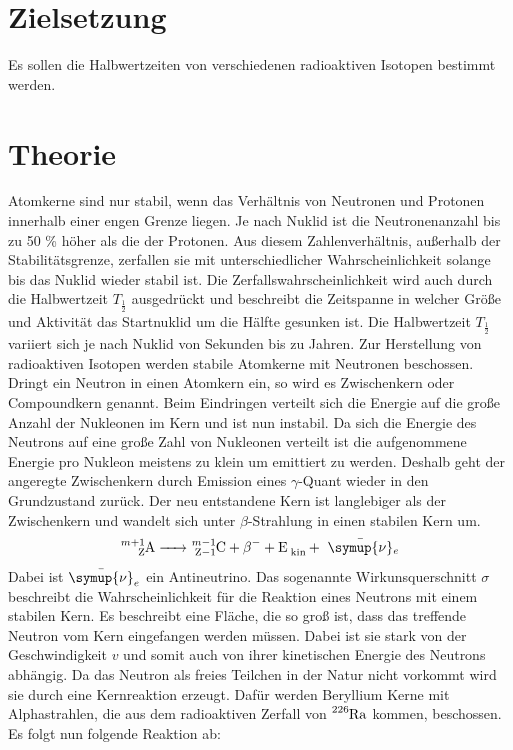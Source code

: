 \section{Zielsetzung}
Es sollen die Halbwertzeiten von verschiedenen radioaktiven Isotopen bestimmt werden.
\section{Theorie}
Atomkerne sind nur stabil, wenn das Verhältnis von Neutronen und Protonen innerhalb einer engen Grenze
liegen.
Je nach Nuklid ist die Neutronenanzahl bis zu 50 \% höher als die der Protonen.
Aus diesem Zahlenverhältnis, außerhalb der Stabilitätsgrenze, zerfallen sie mit unterschiedlicher Wahrscheinlichkeit
solange bis das Nuklid wieder stabil ist.
Die Zerfallswahrscheinlichkeit wird auch durch die Halbwertzeit $T_{\frac{1}{2}}$ ausgedrückt und beschreibt
die Zeitspanne in welcher Größe und Aktivität das Startnuklid um die Hälfte gesunken ist.
Die Halbwertzeit $T_{\frac{1}{2}}$ variiert sich je nach Nuklid von Sekunden bis zu Jahren.
Zur Herstellung von radioaktiven Isotopen werden stabile Atomkerne mit Neutronen beschossen.
Dringt ein Neutron in einen Atomkern ein, so wird es Zwischenkern oder Compoundkern genannt.
Beim Eindringen verteilt sich die Energie auf die große Anzahl der Nukleonen im Kern und ist nun instabil.
Da sich die Energie des Neutrons auf eine große Zahl von Nukleonen verteilt ist die aufgenommene
Energie pro Nukleon meistens zu klein um emittiert zu werden. Deshalb geht der angeregte Zwischenkern durch
Emission eines $\gamma$-Quant wieder in den Grundzustand zurück.
Der neu entstandene Kern ist langlebiger als der Zwischenkern und wandelt sich unter $\beta$-Strahlung in einen stabilen
Kern um.
\begin{equation*}
  \ce{^{m+1}_{Z}A  -> ^{m-1}_{Z-1}C + \beta^- +E _{\text{kin}} +\, \bar{\symup{\nu}}_e}
\end{equation*}
Dabei ist $\bar{\symup{\nu}}_e$ ein Antineutrino.
Das sogenannte Wirkunsquerschnitt $\sigma$ beschreibt die Wahrscheinlichkeit für die Reaktion eines Neutrons mit einem stabilen Kern.
Es beschreibt eine Fläche, die so groß ist, dass das treffende Neutron vom Kern eingefangen werden müssen.
Dabei ist sie stark von der Geschwindigkeit $v$ und somit auch von ihrer kinetischen Energie des Neutrons abhängig.
Da das Neutron als freies Teilchen in der Natur nicht vorkommt wird sie durch eine Kernreaktion erzeugt.
Dafür werden Beryllium Kerne mit Alphastrahlen, die aus dem radioaktiven Zerfall von $\ce{^{226}_{}Ra}$ kommen, beschossen. Es folgt nun folgende Reaktion ab:
